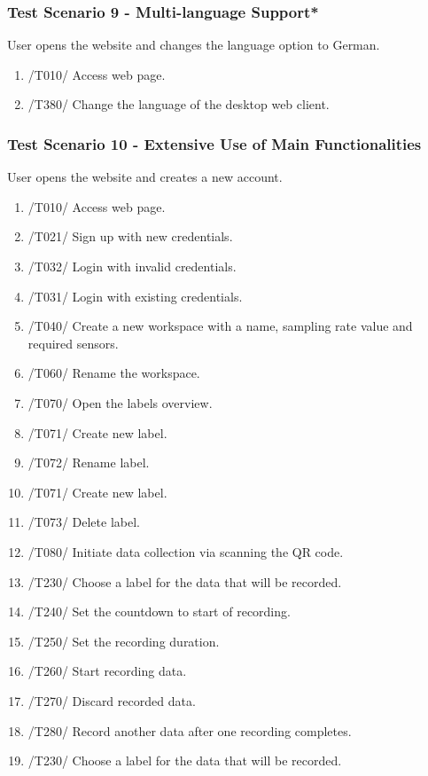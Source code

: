 \subsubsection{Test Scenario 9 - Multi-language Support*}
User opens the website and changes the language option to German. 
\begin{enumerate}
    \item /T010/ Access web page.
    \item /T380/ Change the language of the desktop web client.
\end{enumerate}
\subsubsection{Test Scenario 10 - Extensive Use of Main Functionalities}
User opens the website and creates a new account. 
\begin{enumerate}
    \item /T010/ Access web page. 
    \item /T021/ Sign up with new credentials.
    \item /T032/ Login with invalid credentials.
    \item /T031/ Login with existing credentials.
    \item /T040/ Create a new \gls{workspace} with a name, sampling rate value and required \glspl{sensor}.
    \item /T060/ Rename the \gls{workspace}.
    \item /T070/ Open the labels overview.
    \item /T071/ Create new label.
    \item /T072/ Rename label.
    \item /T071/ Create new label.
    \item /T073/ Delete label.
    \item /T080/ Initiate data collection via scanning the \gls{QR code}.
    \item /T230/ Choose a \gls{label} for the data that will be recorded.
    \item /T240/ Set the countdown to start of recording.
    \item /T250/ Set the recording duration.
    \item /T260/ Start recording data.
    \item /T270/ Discard recorded data.
    \item /T280/ Record another data after one recording completes.
    \item /T230/ Choose a \gls{label} for the data that will be recorded.

\end{enumerate}
